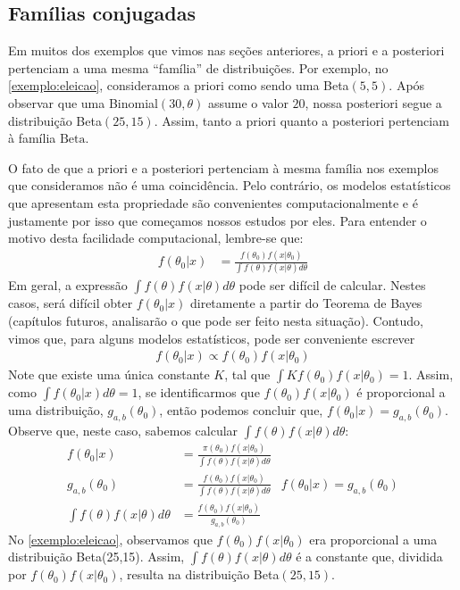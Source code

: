 
\pagebreak


\subsection{Famílias conjugadas}

Em muitos dos exemplos que vimos nas seções anteriores,
a priori e a posteriori pertenciam a uma mesma
``família'' de distribuições.
Por exemplo, no \cref{exemplo:eleicao},
consideramos a priori como sendo uma Beta$(5,5)$.
Após observar que uma Binomial$(30,\theta)$ assume o
valor $20$, nossa posteriori segue a
distribuição Beta$(25,15)$. Assim,
tanto a priori quanto a posteriori pertenciam à
família $\text{Beta}$.

O fato de que a priori e a posteriori pertenciam à
mesma família nos exemplos que consideramos não é
uma coincidência. Pelo contrário, os
modelos estatísticos que apresentam esta propriedade são
convenientes computacionalmente e é
justamente por isso que começamos
nossos estudos por eles.
Para entender o motivo desta facilidade computacional,
lembre-se que:
\begin{align*}
 f(\theta_{0}|x)
 &= \frac{f(\theta_{0})f(x|\theta_{0})}
 {\int{f(\theta)f(x|\theta)d\theta}}
\end{align*}
Em geral, a expressão
$\int{f(\theta)f(x|\theta)d\theta}$
pode ser difícil de calcular.
Nestes casos, será difícil obter
$f(\theta_{0}|x)$ diretamente a partir do
Teorema de Bayes (capítulos futuros, analisarão 
o que pode ser feito nesta situação).
Contudo, vimos que, para alguns modelos estatísticos,
pode ser conveniente escrever
\begin{align*}
 f(\theta_{0}|x) \propto f(\theta_{0})f(x|\theta_{0})
\end{align*}
Note que existe uma única constante $K$, tal que 
$\int{Kf(\theta_{0})f(x|\theta_{0})} = 1$.
Assim, como $\int{f(\theta_{0}|x)d\theta}=1$,
se identificarmos que $f(\theta_{0})f(x|\theta_{0})$
é proporcional a uma distribuição,
$g_{a,b}(\theta_{0})$, então podemos concluir que, $f(\theta_{0}|x) =  g_{a,b}(\theta_{0})$.
Observe que, neste caso, sabemos calcular $\int{f(\theta)f(x|\theta)d\theta}$:
\begin{align*}
 f(\theta_{0}|x) 
 &= \frac{\pi(\theta_{0})f(x|\theta_{0})}
 {\int{f(\theta)f(x|\theta)d\theta}} \\
 g_{a,b}(\theta_{0})
 &= \frac{f(\theta_{0})f(x|\theta_{0})}
 {\int{f(\theta)f(x|\theta)d\theta}}
 & f(\theta_{0}|x) = g_{a,b}(\theta_{0}) \\
 \int{f(\theta)f(x|\theta)d\theta}
 &= \frac{f(\theta_{0})f(x|\theta_{0})}
 {g_{a,b}(\theta_{0})}
\end{align*}
No \cref{exemplo:eleicao}, observamos que
$f(\theta_{0})f(x|\theta_{0})$ era
proporcional a uma distribuição Beta(25,15).
Assim, $\int{f(\theta)f(x|\theta)d\theta}$ é
a constante que, dividida por $f(\theta_{0})f(x|\theta_{0})$,
resulta na distribuição Beta$(25,15)$.

